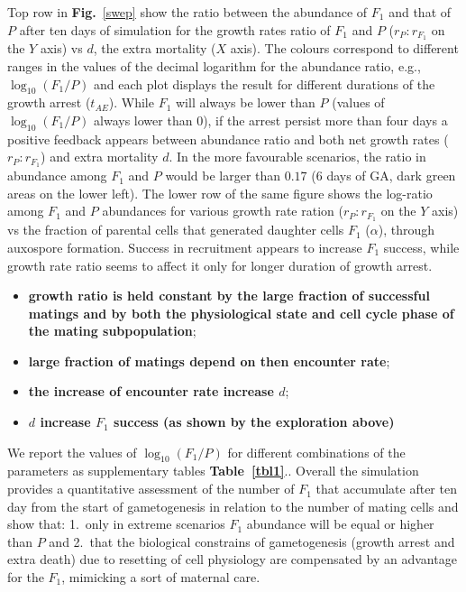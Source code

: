 \documentclass[a4paper,oneside]{article}
\begin{document}
    Top row in \textbf{Fig.}~\ref{swep} show the ratio between the abundance of $F_{1}$ and that of $P$ after ten days of simulation for the growth rates ratio of $F_{1}$ and $P$ ($r_P : r_{F_{1}}$ on the $Y$ axis) vs $d$, the extra mortality ($X$ axis).
    The colours correspond to different ranges in the values of the decimal logarithm for the abundance ratio, e.g., $\log_{10}(F_{1}/P)$ and each plot displays the result for different durations of the growth arrest ($t_{AE}$).
    While $F_{1}$ will always be lower than $P$ (values of $\log_{10}(F_{1}/P)$ always lower than $0$), if the arrest persist more than four days a positive feedback appears between  abundance ratio and both net growth rates ($r_P : r_{F_{1}}$) and extra mortality $d$.
    In the more favourable scenarios, the ratio in abundance among $F_{1}$ and $P$ would be larger than $0.17$ (6 days of GA, dark green areas on the lower left).
    The lower row of the same figure shows the log-ratio among $F_{1}$ and $P$ abundances for various growth rate ration ($r_P : r_{F_{1}}$ on the $Y$ axis) vs the fraction of parental cells that generated daughter cells $F_{1}$ ($\alpha$), through auxospore formation.
    Success in recruitment appears to increase $F_{1}$ success, while growth rate ratio seems to affect it only for longer duration of growth arrest.

    \begin{itemize}
      \item \textbf{\color{brown} growth ratio is held constant by the large fraction of successful matings and by both the physiological state and cell cycle phase of the mating subpopulation};
      \item \textbf{\color{brown} large fraction of matings depend on then encounter rate};
      \item \textbf{\color{brown} the increase of encounter rate increase $d$};
      \item \textbf{\color{brown} $d$ increase $F_{1}$ success (as shown by the exploration above)}
    \end{itemize}
    
    We report the values of $\log_{10}(F_{1}/P)$ for different combinations of the parameters as supplementary tables \textbf{Table~\ref{tbl1}}..
    Overall the simulation provides a quantitative assessment of the number of $F_{1}$ that accumulate after ten day from the start of gametogenesis in relation to the number of mating cells and show that:
    1.\ only in extreme scenarios $F_{1}$ abundance will be equal or higher than $P$ and
    2.\ that the biological constrains of gametogenesis (growth arrest and extra death) due to resetting of cell physiology are compensated by an advantage for the $F_{1}$, mimicking a sort of maternal care.
\end{document}
